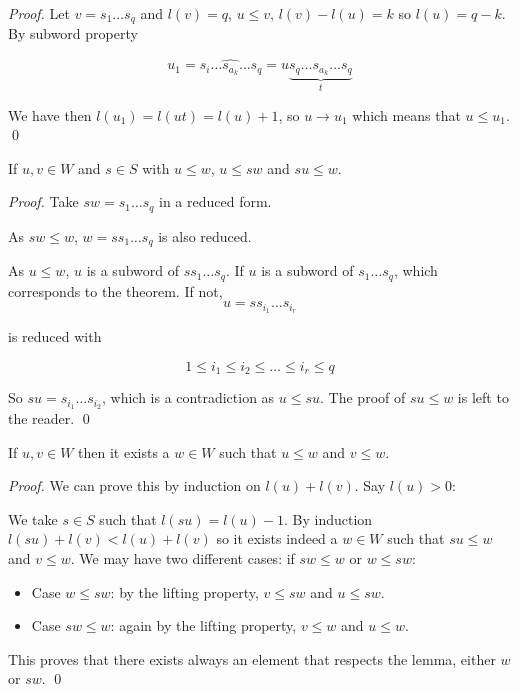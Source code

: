 \begin{proof}
Let $v = s_1 \dots s_q$ and $l(v) = q$, $u \leq v$, $l(v) - l(u) = k$ so $l(u) = q-k$. By subword property

\begin{equation}
  u_1 = s_i \dots \hat{s_{a_k}} \dots s_q = u\underset{t}{\underbrace{s_q \dots s_{a_k} \dots s_q}}
\end{equation}

We have then $l(u_1) = l(ut) = l(u)+1$, so $u \to u_1$ which means that $u \leq u_1$. \qed
\end{proof}

\begin{theorem}
  If $u, v \in W$ and $s \in S$ with $u \leq w$, $u \leq sw$ and $su \leq w$.
\end{theorem}
\begin{proof}
Take $sw = s_1 \dots s_q$ in a reduced form.

As $sw \leq w$, $w = ss_1\dots s_q$ is also reduced.

As $u \leq w$, $u$ is a subword of $ss_1 \dots s_q$. If $u$ is a subword of $s_1 \dots s_q$, which corresponds to the theorem. If not,
\begin{equation}
  u = ss_{i_1} \dots s_{i_r}
\end{equation}

is reduced with

\begin{equation}
  1 \leq i_1 \leq i_2 \leq \dots \leq i_r \leq q
\end{equation}

So $su = s_{i_1} \dots s_{i_2}$, which is a contradiction as $u \leq su$. The proof of $su \leq w$ is left to the reader. \qed
\end{proof}

\begin{lemma}
  If $u,v \in W$ then it exists a $w \in W$ such that $u \leq w$ and $v \leq w$.
\end{lemma}

\begin{proof}
  We can prove this by induction on $l(u) + l(v)$. Say $l(u) > 0$:

  We take $s \in S$ such that $l(su)= l(u) - 1$. By induction $l(su) + l(v) < l(u) + l(v)$ so it exists indeed a $w \in W$ such that $su \leq w$ and $v \leq w$. We may have two different cases: if $sw \leq w$ or $w \leq sw$:

  \begin{itemize}
    \item Case $w \leq sw$: by the lifting property, $v \leq sw$ and $u \leq sw$.
    \item Case $sw \leq w$: again by the lifting property, $v \leq w$ and $u \leq w$.
  \end{itemize}

  This proves that there exists always an element that respects the lemma, either $w$ or $sw$. \qed
\end{proof}

